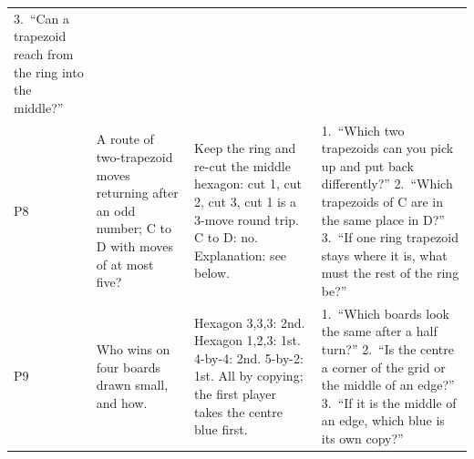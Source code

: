 \documentclass[10pt]{article}
\newcommand{\more}{\newline{\footnotesize further}}
\begin{document}
{\begin{xltabular}{\linewidth}{L{0.42in} L{1.45in} Y Y}
3.~``Can a trapezoid reach from the ring into the middle?''\\
P8\more & A route of two-trapezoid moves returning after an odd number; C to D with moves of at most five? &
Keep the ring and re-cut the middle hexagon: cut 1, cut 2, cut 3, cut 1 is a 3-move round trip. C to D: no. Explanation: see below. &
1.~``Which two trapezoids can you pick up and put back differently?''
2.~``Which trapezoids of C are in the same place in D?''
3.~``If one ring trapezoid stays where it is, what must the rest of the ring be?''\\
P9\more & Who wins on four boards drawn small, and how. &
Hexagon 3,3,3: 2nd. Hexagon 1,2,3: 1st. 4-by-4: 2nd. 5-by-2: 1st. All by copying; the first player takes the centre blue first. &
1.~``Which boards look the same after a half turn?''
2.~``Is the centre a corner of the grid or the middle of an edge?''
3.~``If it is the middle of an edge, which blue is its own copy?''\\
\bottomrule
\end{xltabular}
}
\end{document}
